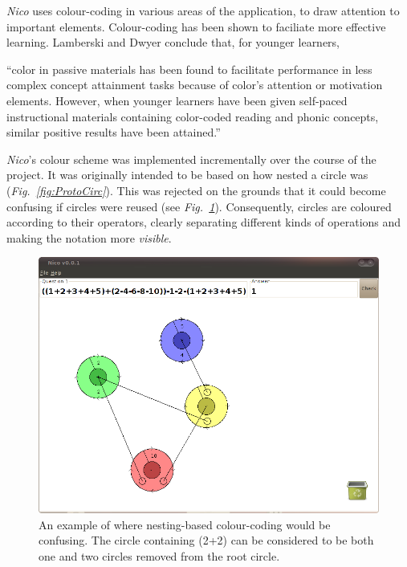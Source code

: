 \documentclass[12pt,twoside,notitlepage,xetex]{report}
\begin{document}
\emph{Nico} uses colour-coding in various areas of the application, to draw attention to important elements.  Colour-coding has been shown to faciliate more effective learning.  Lamberski and Dwyer conclude that, for younger learners,
\begin{center}
\parbox[c]{\textwidth-2cm}{
\small
``color in passive materials has been found to facilitate performance in less complex concept attainment tasks because of color's attention or motivation elements.  However, when younger learners have been given self-paced instructional materials containing color-coded reading and phonic concepts, similar positive results have been attained.'' \cite{Lamberski1983}
}
\end{center}
\emph{Nico}'s colour scheme was implemented incrementally over the course of the project.  It was originally intended to be based on how nested a circle was (\emph{Fig.~\ref{fig:ProtoCirc}}).  This was rejected on the grounds that it could become confusing if circles were reused (see \emph{Fig.~\ref{fig:Nico2}}).  Consequently, circles are coloured according to their operators, clearly separating different kinds of operations and making the notation more \emph{visible}.

\begin{center}
\begin{figure}[H]
\begin{center}
\includegraphics[width=\textwidth-2cm]{figs/nico_screen_02.png}
\end{center}
\caption{An example of where nesting-based colour-coding would be confusing.  The circle containing (2+2) can be considered to be both one and two circles removed from the root circle.}
\label{fig:Nico2}
\end{figure}
\end{center}
\end{document}
